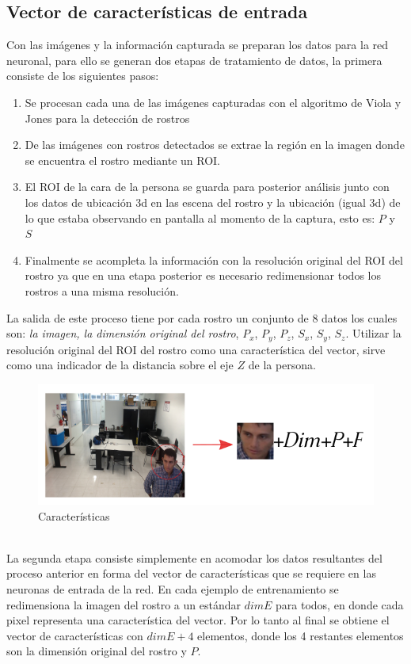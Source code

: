 \subsection{Vector de características de entrada}\label{inFeature}
	Con las imágenes y la información capturada se preparan los datos para la red neuronal, para ello se generan dos etapas de tratamiento de datos, la primera consiste de los siguientes pasos:
	\begin{enumerate}
		\item Se procesan cada una de las imágenes capturadas con el algoritmo de Viola y Jones para la detección de rostros
		\item De las imágenes con rostros detectados se extrae la región en la imagen donde se encuentra el rostro mediante un ROI.
		\item El ROI de la cara de la persona se guarda para posterior análisis junto con los datos de ubicación 3d en las escena del rostro y la ubicación (igual 3d) de lo que estaba observando en pantalla al momento de la captura, esto es: $P$ y $S$
		\item Finalmente se acompleta la información con la resolución original del ROI del rostro ya que en una etapa posterior es necesario redimensionar todos los rostros a una misma resolución.
	\end{enumerate}
	La salida de este proceso tiene por cada rostro un conjunto de 8 datos los cuales son: \textit{la imagen, la dimensión original del rostro}, $P_x$, $P_y$, $P_z$, $S_x$, $S_y$, $S_z$. Utilizar la resolución original del ROI del rostro como una característica del vector, sirve como una indicador de la distancia sobre el eje $Z$ de la persona.%
		\begin{figure}[htbp]
			\centering
			\includegraphics[width=.6\textwidth]{./pictures/featureNet}
			\caption{Características}\label{fig: figura}
		\end{figure}
	\\La segunda etapa consiste simplemente en acomodar los datos resultantes del proceso anterior en forma del vector de características que se requiere en las neuronas de entrada de la red. En cada ejemplo de entrenamiento se redimensiona la imagen del rostro a un estándar $dimE$ para todos, en donde cada pixel representa una característica del vector. Por lo tanto al final se obtiene el vector de características con $dimE+4$ elementos, donde los 4 restantes elementos son la dimensión original del rostro y $P$.

